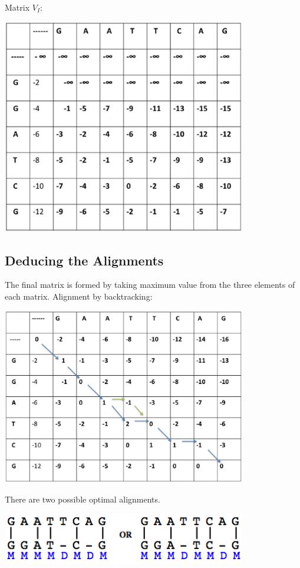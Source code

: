 \documentclass[english, a4paper,11pt]{article}
\begin{document}
Matrix $V_I$:
\begin{center}

\includegraphics[width=0.8\textwidth]{Slide3}
\end{center}

\subsection{Deducing the Alignments}

The final matrix is formed by taking maximum value from the three elements of each matrix.
\newpage
Alignment by backtracking:
\begin{center}
\includegraphics[width=0.8\textwidth]{Slide4}
\end{center}

There are two possible optimal alignments.

\begin{center}
\includegraphics[width=0.8\textwidth]{alignment2.png}
\end{center}
\end{document}
